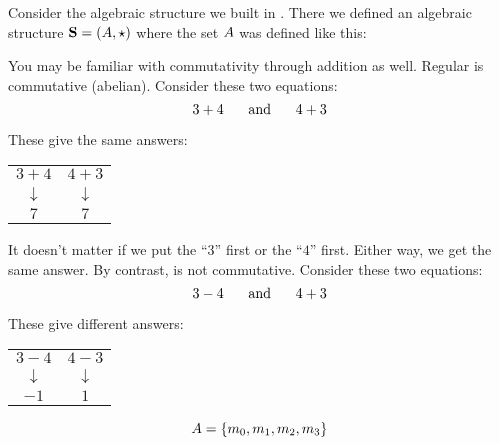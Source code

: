 \documentclass[../../../main.tex]{subfiles}
\begin{document}
\begin{fexample}

Consider the algebraic structure we built in . There we defined an algebraic structure $\algebra{S} = (\set{A}, \opSymbol/)$ where the set $A$ was defined like this:

\begin{aside}
  \begin{remark}
    You may be familiar with commutativity through addition as well. Regular  is commutative (abelian). Consider these two equations:
    \begin{equation*}
      3 + 4 \hskip 0.5cm \text{ and } \hskip 0.5cm 4 + 3
    \end{equation*}
    
    These give the same answers:
    \begin{center}
      \begin{tabular}{c | c}
        $3 + 4$      & $4 + 3$ \\
        $\downarrow$ & $\downarrow$ \\ 
        $7$          & $7$
      \end{tabular}
    \end{center}
    
    It doesn't matter if we put the ``$3$'' first or the ``$4$'' first. Either way, we get the same answer. By contrast,  is not commutative. Consider these two equations:
    \begin{equation*}
      3 - 4 \hskip 0.5cm \text{ and } \hskip 0.5cm 4 + 3
    \end{equation*}
    
    These give different answers:
    \begin{center}
      \begin{tabular}{c | c}
        $3 - 4$      & $4 - 3$ \\
        $\downarrow$ & $\downarrow$ \\ 
        $-1$         & $1$
      \end{tabular}
    \end{center}
    
    
  \end{remark}
\end{aside}

\begin{equation*}
  A = \{ m_{0}, m_{1}, m_{2}, m_{3} \}
\end{equation*}


\end{fexample}
\end{document}
